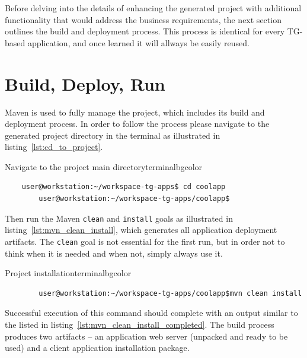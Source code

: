  Before delving into the details of enhancing the generated project with additional functionality that would address the business requirements, the next section outlines the build and deployment process.
  This process is identical for every TG-based application, and once learned it will allways be easily reused.

\section{Build, Deploy, Run}
  Maven is used to fully manage the project, which includes its build and deployment process.
  In order to follow the process please navigate to the generated project directory in the terminal as illustrated in listing~\ref{lst:cd_to_project}.
  
  \begin{code}{Navigate to the project main directory}{\label{lst:cd_to_project}}{terminalbgcolor}
      \begin{lstlisting}
	user@workstation:~/workspace-tg-apps$ cd coolapp
        user@workstation:~/workspace-tg-apps/coolapp$
      \end{lstlisting}
  \end{code}

  Then run the Maven \texttt{clean} and \texttt{install} goals as illustrated in listing~\ref{lst:mvn_clean_install}, which generates all application deployment artifacts.
  The \texttt{clean} goal is not essential for the first run, but in order not to think when it is needed and when not, simply always use it.

  \begin{code}{Project installation}{\label{lst:mvn_clean_install}}{terminalbgcolor}
     \begin{lstlisting}
        user@workstation:~/workspace-tg-apps/coolapp$mvn clean install
     \end{lstlisting}
  \end{code}

  Successful execution of this command should complete with an output similar to the listed in listing~\ref{lst:mvn_clean_install_completed}.
  The build process produces two artifacts -- an application web server (unpacked and ready to be used) and a client application installation package.
  
